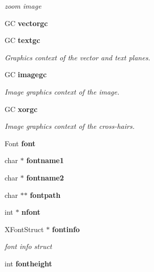 \begin{CompactItemize}
\begin{CompactList}\small\item\em zoom image \item\end{CompactList}\item 
GC {\bf vectorgc}\label{xtvutils_8c_a19}

\item 
GC {\bf textgc}\label{xtvutils_8c_a20}

\begin{CompactList}\small\item\em Graphics context of the vector and text planes. \item\end{CompactList}\item 
GC {\bf imagegc}\label{xtvutils_8c_a21}

\begin{CompactList}\small\item\em Image graphics context of the image. \item\end{CompactList}\item 
GC {\bf xorgc}\label{xtvutils_8c_a22}

\begin{CompactList}\small\item\em Image graphics context of the cross-hairs. \item\end{CompactList}\item 
Font {\bf font}\label{xtvutils_8c_a23}

\item 
char $\ast$ {\bf fontname1}\label{xtvutils_8c_a24}

\item 
char $\ast$ {\bf fontname2}\label{xtvutils_8c_a25}

\item 
char $\ast$$\ast$ {\bf fontpath}\label{xtvutils_8c_a26}

\item 
int $\ast$ {\bf nfont}\label{xtvutils_8c_a27}

\item 
XFont\-Struct $\ast$ {\bf fontinfo}\label{xtvutils_8c_a28}

\begin{CompactList}\small\item\em font info struct \item\end{CompactList}\item 
int {\bf fontheight}\label{xtvutils_8c_a29}


\end{CompactItemize}

